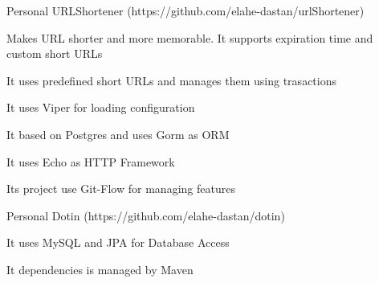 

\begin{cventries}

    \cventry
    {Personal} %
    {URLShortener ({\tiny https://github.com/elahe-dastan/urlShortener})} %
    {} %
    {} %
    {
      \begin{cvitems} %
        \item{Makes URL shorter and more memorable. It supports expiration time and custom short URLs}
        \item{It uses predefined short URLs and manages them using trasactions}
        \item{It uses Viper for loading configuration}
        \item{It based on Postgres and uses Gorm as ORM}
        \item{It uses Echo as HTTP Framework}
        \item{Its project use Git-Flow for managing features}
      \end{cvitems}
    }

    \cventry
    {Personal}
    {Dotin ({\tiny https://github.com/elahe-dastan/dotin})}
    {}
    {}
    {
        \begin{cvitems} %
            \item It uses MySQL and JPA for Database Access
            \item It dependencies is managed by Maven
        \end{cvitems}
    }

\end{cventries}

